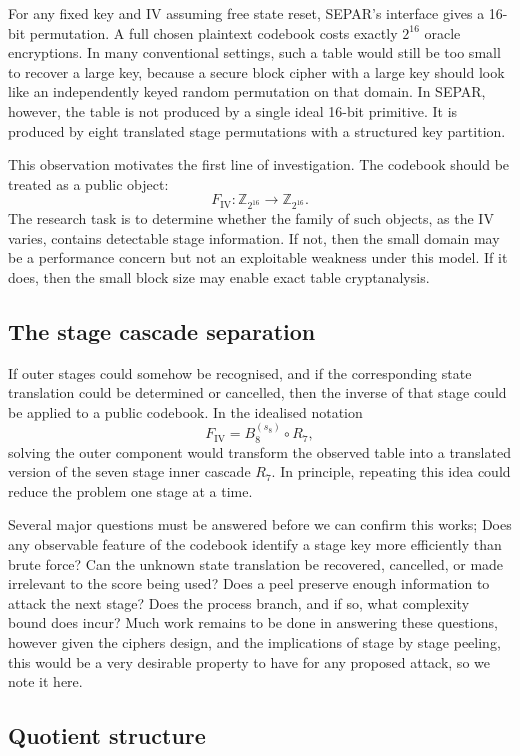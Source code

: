 \documentclass[11pt]{article}
\newcommand{\Z}[1]{\mathbb{Z}_{#1}}
\begin{document}
For any fixed key and IV assuming free state reset, SEPAR's interface gives a 16-bit permutation. A full chosen plaintext codebook costs exactly $2^{16}$ oracle encryptions. In many conventional settings, such a table would still be too small to recover a large key, because a secure block cipher with a large key should look like an independently keyed random permutation on that domain. In SEPAR, however, the table is not produced by a single ideal 16-bit primitive. It is produced by eight translated stage permutations with a structured key partition.

This observation motivates the first line of investigation. The codebook should be treated as a public object:
\[
F_{\mathrm{IV}}:\Z{2^{16}}\to\Z{2^{16}}.
\]
The research task is to determine whether the family of such objects, as the IV varies, contains detectable stage information. If not, then the small domain may be a performance concern but not an exploitable weakness under this model. If it does, then the small block size may enable exact table cryptanalysis.

\subsection{The stage cascade separation}

If outer stages could somehow be recognised, and if the corresponding state translation could be determined or cancelled, then the inverse of that stage could be applied to a public codebook. In the idealised notation
\[
F_{\mathrm{IV}}=B_8^{(s_8)}\circ R_7,
\]
solving the outer component would transform the observed table into a translated version of the seven stage inner cascade $R_7$. In principle, repeating this idea could reduce the problem one stage at a time.

Several major questions must be answered before we can confirm this works; Does any observable feature of the codebook identify a stage key more efficiently than brute force? Can the unknown state translation be recovered, cancelled, or made irrelevant to the score being used? Does a peel preserve enough information to attack the next stage? Does the process branch, and if so, what complexity bound does incur? Much work remains to be done in answering these questions, however given the ciphers design, and the implications of stage by stage peeling, this would be a very desirable property to have for any proposed attack, so we note it here.

\subsection{Quotient structure}
\end{document}
